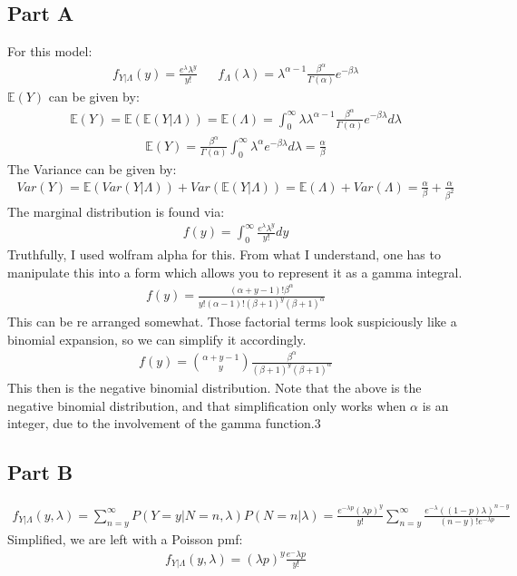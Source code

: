 \documentclass{article}
\begin{document}
\subsection*{Part A}
For this model:
\begin{align*}
f_{Y| \Lambda}(y) = \frac{e^{\lambda} \lambda^y}{y!} && f_{\Lambda}(\lambda) = \lambda^{\alpha-1} \frac{\beta^{\alpha}}{\Gamma (\alpha)} e^{-\beta \lambda} 
\end{align*}
$\mathbb{E}(Y)$ can be given by:
\begin{align*}
\mathbb{E}(Y) = \mathbb{E}(\mathbb{E}(Y|\Lambda)) = \mathbb{E}(\Lambda) = \int_{0}^{\infty} \lambda \lambda^{\alpha-1} \frac{\beta^{\alpha}}{\Gamma (\alpha)} e^{-\beta \lambda}  d \lambda
\end{align*}
\begin{align*}
\mathbb{E}(Y) = \frac{\beta^{\alpha}}{\Gamma (\alpha)} \int_{0}^{\infty} \lambda^{\alpha} e^{-\beta \lambda}  d \lambda = \boxed{ \frac{\alpha}{\beta} }
\end{align*}
The Variance can be given by:
\begin{align*}
Var(Y) = \mathbb{E}(Var(Y|\Lambda )) + Var(\mathbb{E}(Y|\Lambda)) = \mathbb{E}(\Lambda ) + Var(\Lambda) =\boxed{ \frac{\alpha}{\beta} + \frac{\alpha}{\beta^2} }
\end{align*}
The marginal distribution is found via:
\begin{align*}
f(y) = \int_{0}^{\infty} \frac{e^{\lambda} \lambda^y}{y!} dy
\end{align*}
Truthfully, I used wolfram alpha for this. From what I understand, one has to manipulate this into a form which allows you to represent it as a gamma integral.
\begin{align*}
f(y) = \frac{(\alpha+y-1)! \beta^\alpha}{y! (\alpha - 1)! (\beta+1)^y (\beta+1)^\alpha}
\end{align*}
This can be re arranged somewhat. Those factorial terms look suspiciously like a binomial expansion, so we can simplify it accordingly.
\begin{align*}
\boxed{ f(y) = \binom{\alpha + y - 1}{y}\frac{\beta^\alpha}{(\beta+1)^y (\beta+1)^\alpha} }
\end{align*}
This then is the negative binomial distribution. Note that the above is the negative binomial distribution, and that simplification only works when $\alpha$ is an integer, due to the involvement of the gamma function.3
\subsection*{Part B}
\begin{align*}
f_{Y|\Lambda }(y,\lambda ) = \sum_{n=y}^{\infty} P(Y=y| N=n,\lambda ) P(N=n|\lambda ) = \frac{e^{-\lambda p} (\lambda p)^y}{y!} \sum_{n=y}^{\infty} \frac{e^{-\lambda} ((1-p)\lambda)^{n-y}}{(n-y)!e^{-\lambda p}}
\end{align*} 
Simplified, we are left with a Poisson pmf:
\begin{align*}
f_{Y|\Lambda }(y,\lambda ) = (\lambda p)^y \frac{e^-{\lambda p}}{y!} 
\end{align*}
\end{document}
